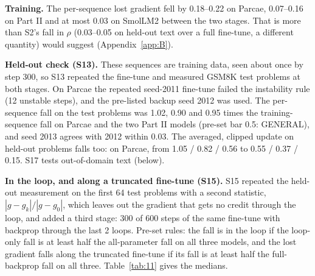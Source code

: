 \documentclass[10pt]{article}
\begin{document}
\textbf{Training.} The per-sequence lost gradient fell by 0.18--0.22 on Parcae, 0.07--0.16 on Part II and at most 0.03 on SmolLM2 between the two stages. That is more than S2's fall in $\rho$ (0.03--0.05 on held-out text over a full fine-tune, a different quantity) would suggest (Appendix~\ref{app:B}).

\textbf{Held-out check (S13).} These sequences are training data, seen about once by step 300, so S13 repeated the fine-tune and measured GSM8K test problems at both stages. On Parcae the repeated seed-2011 fine-tune failed the instability rule (12 unstable steps), and the pre-listed backup seed 2012 was used. The per-sequence fall on the test problems was 1.02, 0.90 and 0.95 times the training-sequence fall on Parcae and the two Part II models (pre-set bar 0.5: GENERAL), and seed 2013 agrees with 2012 within 0.03. The averaged, clipped update on held-out problems falls too: on Parcae, from 1.05 / 0.82 / 0.56 to 0.55 / 0.37 / 0.15. S17 tests out-of-domain text (below).

\textbf{In the loop, and along a truncated fine-tune (S15).} S15 repeated the held-out measurement on the first 64 test problems with a second statistic, $|g - g_k| / |g - g_0|$, which leaves out the gradient that gets no credit through the loop, and added a third stage: 300 of 600 steps of the same fine-tune with backprop through the last 2 loops. Pre-set rules: the fall is in the loop if the loop-only fall is at least half the all-parameter fall on all three models, and the lost gradient falls along the truncated fine-tune if its fall is at least half the full-backprop fall on all three. Table~\ref{tab:11} gives the medians.
\end{document}
